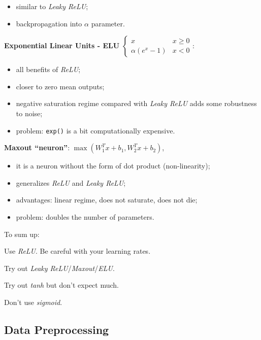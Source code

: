 \begin{myitem}
    \begin{itemize}
        \item similar to \textit{Leaky ReLU};
        \item backpropagation into $\alpha$ parameter.
    \end{itemize}
    \item \textbf{Exponential Linear Units - ELU}
    $\begin{cases}
    x              &x \geq 0\\
    \alpha(e^x -1) &x < 0
    \end{cases}$:
    \begin{itemize}
        \item all benefits of \textit{ReLU};
        \item closer to zero mean outputs;
        \item negative saturation regime compared with \textit{Leaky ReLU} adds some robustness to noise;
        \item problem: \texttt{exp()} is a bit computationally expensive.
    \end{itemize}
    \item \textbf{Maxout ``neuron''}: $\max(W_1^T x + b_1, W_2^T x + b_2)$,
    \begin{itemize}
        \item it is a neuron without the form of dot product (non-linearity);
        \item generalizes \textit{ReLU} and \textit{Leaky ReLU};
        \item advantages: linear regime, does not saturate, does not die;
        \item problem: doubles the number of parameters.
    \end{itemize}
\end{myitem}

To sum up:
\begin{myitem}
    \item Use \textit{ReLU}. Be careful with your learning rates.
    \item Try out \textit{Leaky ReLU}/\textit{Maxout}/\textit{ELU}.
    \item Try out \textit{tanh} but don’t expect much.
    \item Don’t use \textit{sigmoid}.
\end{myitem}


\subsection{Data Preprocessing}\label{sec:tnn-preprocessing}

